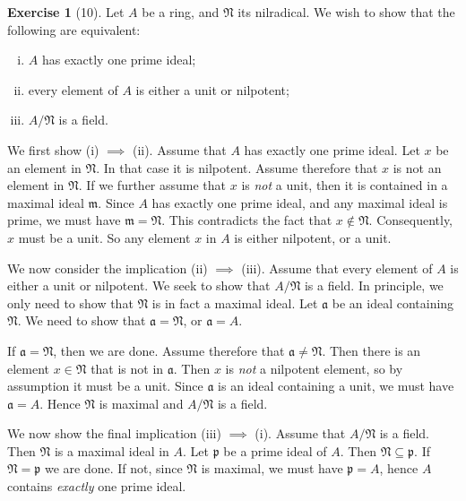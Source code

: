 \documentclass{article}
\theoremstyle{definition}
\newtheorem*{exercise}{Exercise}
\begin{document}
\begin{exercise}[10]
    Let $A$ be a ring, and $\mathfrak{N}$ its nilradical. We wish to show that the following are equivalent:
    \begin{enumerate}[(i)]
        \item $A$ has exactly one prime ideal;
        \item every element of $A$ is either a unit or nilpotent;
        \item $A / \mathfrak{N}$ is a field.
    \end{enumerate}
    We first show (i) $\implies$ (ii). Assume that $A$ has exactly one
    prime ideal. Let $x$ be an element in $\mathfrak{N}$. In that case it
    is nilpotent. Assume therefore that $x$ is not an element in
    $\mathfrak{N}$. If we further assume that $x$ is \emph{not} a unit,
    then it is contained in a maximal ideal $\mathfrak{m}$. Since $A$ has
    exactly one prime ideal, and any maximal ideal is prime, we must have
    $\mathfrak{m} = \mathfrak{N}$. This contradicts the fact that $x \notin
    \mathfrak{N}$. Consequently, $x$ must be a unit. So any element $x$ in
    $A$ is either nilpotent, or a unit.

    We now consider the implication (ii) $\implies$ (iii). Assume that
    every element of $A$ is either a unit or nilpotent. We seek to show
    that $A / \mathfrak{N}$ is a field. In principle, we only need to show
    that $\mathfrak{N}$ is in fact a maximal ideal. Let $\mathfrak{a}$ be
    an ideal containing $\mathfrak{N}$. We need to show that $\mathfrak{a}
    = \mathfrak{N}$, or $\mathfrak{a} = A$.

    If $\mathfrak{a} = \mathfrak{N}$, then we are done. Assume therefore
    that $\mathfrak{a} \neq \mathfrak{N}$. Then there is an element $x \in
    \mathfrak{N}$ that is not in $\mathfrak{a}$. Then $x$ is \emph{not} a
    nilpotent element, so by assumption it must be a unit. Since
    $\mathfrak{a}$ is an ideal containing a unit, we must have
    $\mathfrak{a} = A$. Hence $\mathfrak{N}$ is maximal and $A /
    \mathfrak{N}$ is a field.

    We now show the final implication (iii) $\implies$ (i). Assume that $A
    / \mathfrak{N}$ is a field. Then $\mathfrak{N}$ is a maximal ideal in
    $A$. Let $\mathfrak{p}$ be a prime ideal of $A$. Then $\mathfrak{N}
    \subseteq \mathfrak{p}$. If $\mathfrak{N} = \mathfrak{p}$ we are done.
    If not, since $\mathfrak{N}$ is maximal, we must have $\mathfrak{p} =
    A$, hence $A$ contains \emph{exactly} one prime ideal.
\end{exercise}
\end{document}
